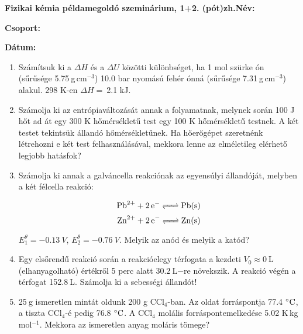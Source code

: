 \documentclass[a4paper, 11pt]{article}
\begin{document}
\textbf{Fizikai kémia példamegoldó szeminárium, 1+2. (pót)zh.}\hfill \textbf{Név:}

\hfill \textbf{Csoport:}

\hfill \textbf{Dátum:}

\thispagestyle{empty}

\begin{enumerate}

\item Számítsuk ki a $\Delta H$ és a $\Delta U$ közötti különbséget, ha 1 mol szürke ón (sűrűsége 5.75$~$g$\,$cm$^{-3}$) 10.0 bar nyomású fehér ónná (sűrűsége 7.31$~$g$\,$cm$^{-3}$) alakul. 298 K-en $\Delta H=~$2.1 kJ.

\item Számolja ki az entrópiaváltozását annak a folyamatnak, melynek során 100 J hőt ad át egy 300 K hőmérsékletű test egy 100 K hőmérsékletű testnek. A két testet tekintsük állandó hőmérsékletűnek. Ha hőerőgépet szeretnénk létrehozni e két test felhasználásával, mekkora lenne az elméletileg elérhető legjobb hatásfok?

\item Számolja ki annak a galváncella reakciónak az egyensúlyi állandóját, melyben a két félcella reakció:

\begin{equation}
        \ce{Pb^{2+} + 2e^- <=> Pb(s)}
\end{equation}
\begin{equation}
        \ce{Zn^{2+} + 2e^- <=> Zn(s)}
\end{equation}

$E_1^\theta=-0.13~V$, $E_2^\theta=-0.76~V$. Melyik az anód és melyik a katód?

\item Egy elsőrendű reakció során a reakcióelegy térfogata a kezdeti $V_0\approx0~$L (elhanyagolható) értékről 5 perc alatt $30.2~$L$-$re növekszik. A reakció végén a térfogat 152.8$~$L. Számolja ki a sebességi állandót!

\item 25$~$g ismeretlen mintát oldunk 200 g CCl$_4$-ban. Az oldat forráspontja 77.4$~\celsius$, a tiszta CCl$_4$-é pedig 76.8$~\celsius$. A CCl$_4$ molális forráspontemelkedése 5.02 K$\,$kg$\,$mol$^{-1}$. Mekkora az ismeretlen anyag moláris tömege?

\end{enumerate}
\end{document}
